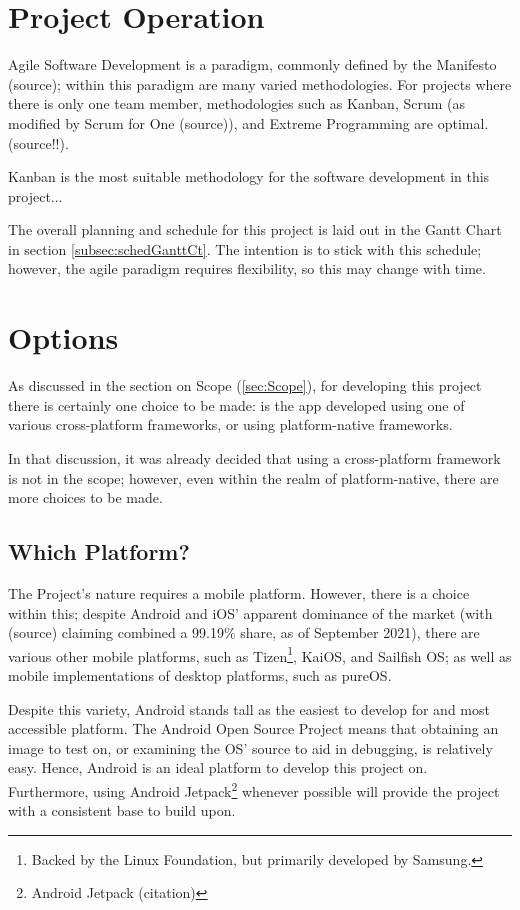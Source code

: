 \documentclass[11pt, a4paper, notitlepage]{report}
\begin{document}
\section{Project Operation}\label{sec:projectOperation}
Agile Software Development is a paradigm, commonly defined by the Manifesto 
(source); within this paradigm are many varied methodologies. For projects 
where there is only one team member, methodologies such as Kanban, 
Scrum (as modified by Scrum for One (source)), and Extreme Programming are 
optimal. (source!!).

Kanban is the most suitable methodology for the software development in this 
project...%

The overall planning and schedule for this project is laid out in the Gantt 
Chart in section \ref{subsec:schedGanttCt}. The intention is to stick with this 
schedule; however, the agile paradigm requires flexibility, so this may change 
with time.

\section{Options}
As discussed in the section on Scope (\ref{sec:Scope}), for developing this 
project there is certainly one choice to be made: is the app developed using 
one of various cross-platform frameworks, or using platform-native frameworks.

In that discussion, it was already decided that using a cross-platform 
framework is not in the scope; however, even within the realm of 
platform-native, there are more choices to be made.

\subsection{Which Platform?}
The Project's nature requires a mobile platform. However, there is a choice 
within this; despite Android and iOS' apparent dominance of the market (with 
(source) claiming combined a 99.19\% share, as of September 2021), there 
are various other mobile platforms, such as Tizen\footnote{Backed by the Linux 
Foundation, but primarily developed by Samsung.}, KaiOS, and Sailfish OS; as 
well as mobile implementations of desktop platforms, such as pureOS.

Despite this variety, Android stands tall as the easiest to develop for and 
most accessible platform. The Android Open Source Project means that obtaining 
an image to test on, or examining the OS' source to aid in debugging, is 
relatively easy. Hence, Android is an ideal platform to develop this project 
on. Furthermore, using Android Jetpack\footnote{Android Jetpack (citation)} 
whenever possible will provide the project with a consistent base to build upon.
\end{document}

